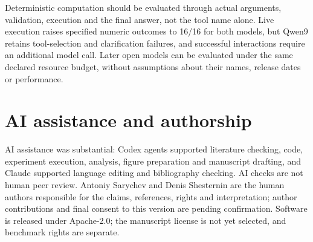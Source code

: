 \documentclass[10pt,a4paper]{article}
\begin{document}
Deterministic computation should be evaluated through actual arguments, validation, execution and the final answer, not the tool name alone. Live execution raises specified numeric outcomes to 16/16 for both models, but Qwen9 retains tool-selection and clarification failures, and successful interactions require an additional model call. Later open models can be evaluated under the same declared resource budget, without assumptions about their names, release dates or performance.

\section*{AI assistance and authorship}
AI assistance was substantial: Codex agents supported literature checking, code, experiment execution, analysis, figure preparation and manuscript drafting, and Claude supported language editing and bibliography checking. AI checks are not human peer review. Antoniy Sarychev and Denis Shesternin are the human authors responsible for the claims, references, rights and interpretation; author contributions and final consent to this version are pending confirmation. Software is released under Apache-2.0; the manuscript license is not yet selected, and benchmark rights are separate.
\end{document}
